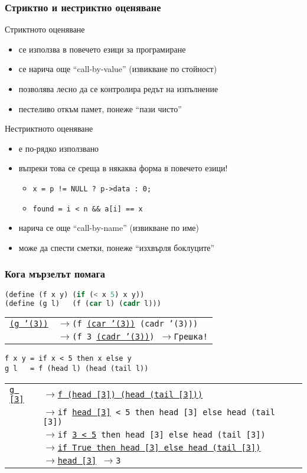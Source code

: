 \documentclass{beamer}
\newcommand{\lra}{\onslide<+->$\longrightarrow$\xspace}
\begin{document}
\begin{frame}
  \frametitle{Стриктно и нестриктно оценяване}

  Стриктното оценяване
  \begin{itemize}[<+->]
  \item се използва в повечето езици за програмиране
  \item се нарича още ``call-by-value'' (извикване по стойност)
  \item позволява лесно да се контролира редът на изпълнение
  \item пестеливо откъм памет, понеже ``пази чисто''
  \end{itemize}
  \onslide<+->
  Нестриктното оценяване
  \begin{itemize}[<+->]
  \item е по-рядко използвано
  \item въпреки това се среща в някаква форма в повечето езици!
    \begin{itemize}
    \item \tt{x = p != NULL ? p->data : 0;}
    \item \tt{found = i < n \&\& a[i] == x}
    \end{itemize}
  \item нарича се още ``call-by-name'' (извикване по име)
  \item може да спести сметки, понеже ``изхвърля боклуците''
  \end{itemize}
\end{frame}

\begin{frame}[fragile]
  \frametitle{Кога мързелът помага}

\begin{lstlisting}[language=Scheme]
(define (f x y) (if (< x 5) x y))
(define (g l)   (f (car l) (cadr l)))
\end{lstlisting}
\pause
\begin{tabular}[t]{l@{}l}
\tt{\underline{(g '(3))}}
&\lra \tt{(f \underline{(car '(3))} (cadr '(3)))}\\
&\lra \tt{(f 3 \underline{(cadr '(3))})}
\lra \alert{Грешка!}
\end{tabular}
\onslide<+->
\begin{lstlisting}
f x y = if x < 5 then x else y
g l   = f (head l) (head (tail l))
\end{lstlisting}
\onslide<+->
\begin{tabular}[t]{l@{}l}
\tt{\underline{g [3]}}
&\lra \tt{\underline{f (head [3]) (head (tail [3]))}}\\
&\lra \tt{if} \underline{\tt{head [3]}} \tt{< 5 then head [3] else head (tail [3])}\\
&\lra \tt{if \underline{3 < 5} then head [3] else head (tail [3])}\\
&\lra \tt{\underline{if True then head [3] else head (tail [3])}}\\
&\lra \tt{\underline{head [3]}}
\lra \tt 3
\end{tabular}
\end{frame}
\end{document}
